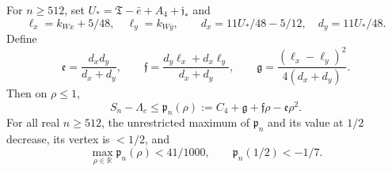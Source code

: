 \begin{corollary}\label{uc:relative-gate}
For $n\geq512$, set $U_*=\mathfrak T-\bar e+A_4+\mathfrak j_*$ and
\[
 \ell_x=k_{Wx}+5/48,\quad\ell_y=k_{Wy},\qquad
 d_x=11U_*/48-5/12,\quad d_y=11U_*/48.
\]
Define
\begin{equation}\label{ul:radial-quadratic}
 \mathfrak e=\frac{d_xd_y}{d_x+d_y},\qquad
 \mathfrak f=\frac{d_y\ell_x+d_x\ell_y}{d_x+d_y},\qquad
 \mathfrak g=\frac{(\ell_x-\ell_y)^2}{4(d_x+d_y)}.
\end{equation}
Then on $\rho\leq1$,
\begin{equation}\label{ul:wide-polynomial}
 S_n-\Lambda_c\leq \mathfrak p_n(\rho):=C_4+\mathfrak g+
                              \mathfrak f\rho-\mathfrak e\rho^2.
\end{equation}
For all real $n\geq512$, the unrestricted maximum of $\mathfrak p_n$ and its
value at $1/2$ decrease, its vertex is $<1/2$, and
\begin{equation}\label{uc:relative-gate-bounds}
 \max_{\rho\in\mathbb R}\mathfrak p_n(\rho)<41/1000,\qquad
 \mathfrak p_n(1/2)<-1/7.
\end{equation}
\end{corollary}
